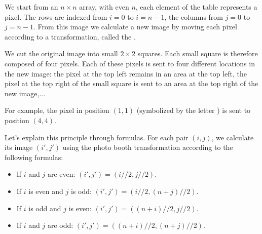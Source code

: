 \documentclass[11pt,class=report,crop=false]{standalone}
\begin{document}




\begin{cours}

We start from an $n\times n$ array, with even $n$, each element of the table represents a pixel. The rows are indexed from $i=0$ to $i=n-1$, the columns from $j=0$ to $j=n-1$.
From this image we calculate a new image by moving each pixel according to a transformation, called the .

We cut the original image into small $2\times2$ squares.
Each small square is therefore composed of four pixels. Each of these pixels is sent to four different locations in the new image:
the pixel at the top left remains in an area at the top left, the pixel at the top right of the small square is sent to an area at the top right of the new image,...


For example, the pixel in position $(1,1)$ (symbolized by the letter ) is sent to position $(4,4)$.

\medskip

Let's explain this principle through formulas. For each pair $(i,j)$, we calculate its image $(i',j')$ using the photo booth transformation according to the following formulas:
\begin{itemize}
  \item If $i$ and $j$ are even: $(i',j') = (i//2,j//2)$.
  \item If $i$ is even and $j$ is odd: $(i',j') = (i//2,(n+j)//2)$.  
  \item If $i$ is odd and $j$ is even: $(i',j') = ((n+i)//2,j//2)$.
  \item If $i$ and $j$ are odd: $(i',j') = ((n+i)//2,(n+j)//2)$.
\end{itemize}


\medskip


\end{cours}
\end{document}
